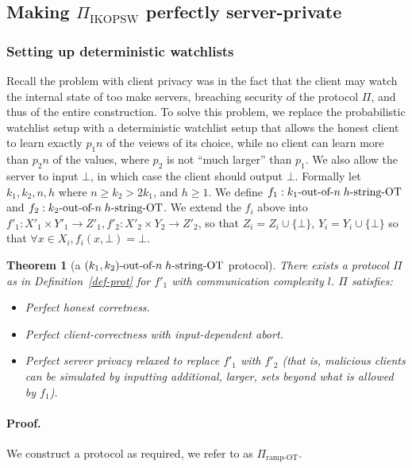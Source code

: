 \documentclass[a4paper]{article}
\newtheorem{theorem}{Theorem}[section]
\newcommand{\sOT}[3]{#1\text{-out-of-}#2\text{\;$#3$-string-OT}}
\begin{document}
\subsection{Making $\Pi_{\text{IKOPSW}}$ perfectly server-private}\label{sec-client-pr}

\subsubsection{Setting up deterministic watchlists}
Recall the problem with client privacy was in the fact that the client may watch the internal state of too make servers, breaching security of the protocol $\Pi$, and thus of the entire construction.
To solve this problem, we replace the probabilistic watchlist setup with a deterministic watchlist setup that allows the honest client to learn exactly $p_1n$ of the veiews of its choice, while no client can learn more than $p_2n$ of the values, where $p_2$ is not ``much larger'' than $p_1$. We also allow the server to input $\bot$, in which case the client should output $\bot$. Formally let $k_1,k_2,n,h$ where $n\geq k_2 > 2k_1$, and $h\geq 1$. We define $f_1:\sOT{k_1}{n}{h}$ and $f_2:\sOT{k_2}{n}{h}$. We extend the $f_i$ above into $f'_1:X'_1\times Y'_1\rightarrow Z'_1,f'_2:X'_2\times Y_2\rightarrow Z'_2$, so that $Z_i=Z_i\cup{\{\bot\}}$, $Y_i=Y_i\cup{\{\bot\}}$  so that $\forall x\in X_i,f_i(x,\bot)=\bot$.

\begin{theorem}[a $\sOT{(k_1,k_2)}{n}{h}$ protocol]
	There exists a protocol $\Pi$ as in Definition~\ref{def-prot} for $f'_1$ with communication complexity $l$. $\Pi$ satisfies:
	\begin{itemize}
	\item Perfect honest corretness.	
	\item Perfect client-correctness with input-dependent abort.
	\item Perfect server privacy relaxed to replace $f'_1$ with $f'_2$ (that is, malicious clients can be simulated by inputting additional, larger, sets beyond what is allowed by $f_1$).
	 \end{itemize} 
\end{theorem}

\paragraph{Proof.} We construct a protocol as required, we refer to as $\Pi_{\text{ramp-OT}}$.
\end{document}
